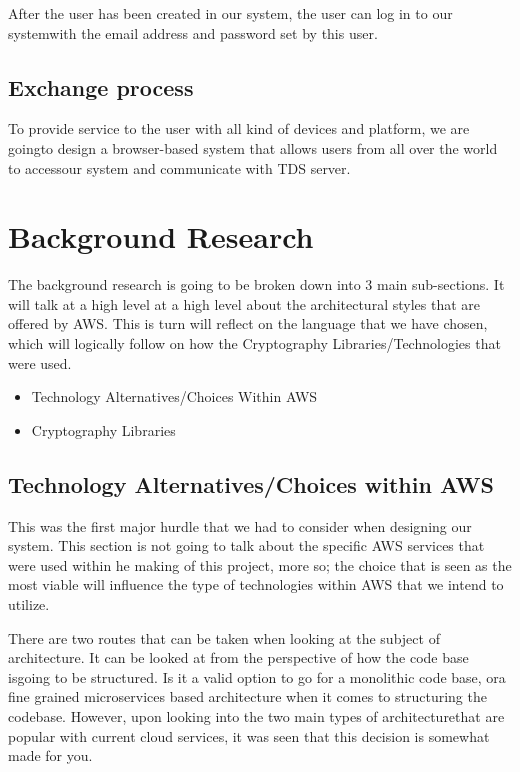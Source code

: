 \documentclass[runningheads]{llncs}
\begin{document}
After the user has been created in our system, the user can log in to our systemwith the email address and password set by this user.

\subsection{Exchange process}
To provide service to the user with all kind of devices and platform, we are goingto design a browser-based system that allows users from all over the world to accessour system and communicate with TDS server.


\section{Background Research} 
The background research is going to be broken down into 3 main sub-sections. It will talk at a high level at a high level about the architectural styles that are offered by AWS. This is turn will reflect on the language that we have chosen, which will logically follow on how the Cryptography Libraries/Technologies that were used.
\begin{itemize}
	\item Technology Alternatives/Choices Within AWS
	\item Cryptography Libraries
\end{itemize}

\subsection{Technology Alternatives/Choices within AWS}
This was the first major hurdle that we had to consider when designing our system. This section is not going to talk about the specific AWS services that were used within he making of this project, more so; the choice that is seen as the most viable will influence the type of technologies within AWS that we intend to utilize. 

There are two routes that can be taken when looking at the subject of architecture. It can be looked at from the perspective of how the code base isgoing to be structured. Is it a valid option to go for a monolithic code base, ora fine grained microservices based architecture when it comes to structuring the codebase. However, upon looking into the two main types of architecturethat are popular with current cloud services, it was seen that this decision is somewhat made for you.
\end{document}
